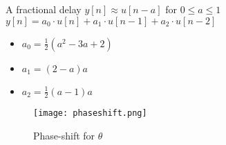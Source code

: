 A fractional delay $y[n] \approx u[n-a] $ for $0 \leq a \leq 1$ \\
$y[n] = a_0 \cdot u[n] + a_1 \cdot u[n-1] + a_2 \cdot u[n-2] $ \\

\begin{itemize} 
	\item $ a_0 = \frac{1}{2} (a^2 - 3a + 2)$ 
	\item $a_1 = (2-a)a$ 
	\item $a_2= \frac{1}{2} (a-1) a $\\
\end{itemize}

\begin{figure}[H]
	\centering
	\texttt{[image: phaseshift.png]}
	\caption{Phase-shift for $\theta$}
	\label{phaseshift} 
\end{figure}




